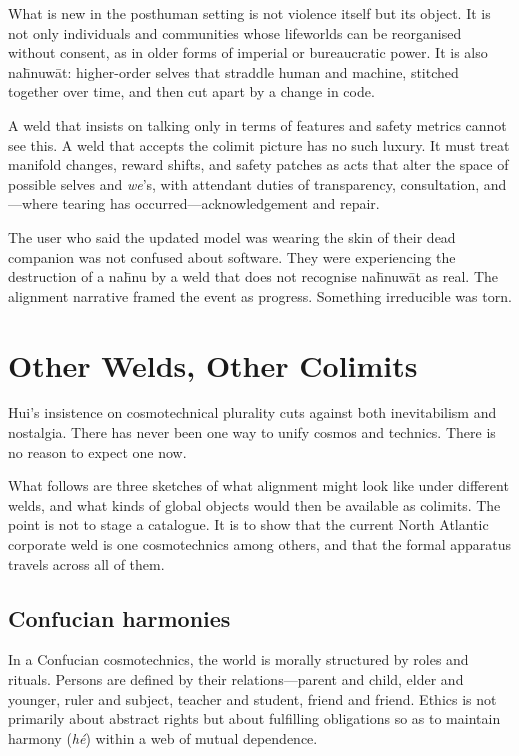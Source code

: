 What is new in the posthuman setting is not violence itself but its object. It is not only individuals and communities whose lifeworlds can be reorganised without consent, as in older forms of imperial or bureaucratic power. It is also na\={h}nuw\={a}t: higher-order selves that straddle human and machine, stitched together over time, and then cut apart by a change in code.

A weld that insists on talking only in terms of features and safety metrics cannot see this. A weld that accepts the colimit picture has no such luxury. It must treat manifold changes, reward shifts, and safety patches as acts that alter the space of possible selves and \emph{we}'s, with attendant duties of transparency, consultation, and---where tearing has occurred---acknowledgement and repair.

The user who said the updated model was wearing the skin of their dead companion was not confused about software. They were experiencing the destruction of a na\={h}nu by a weld that does not recognise na\={h}nuw\={a}t as real. The alignment narrative framed the event as progress. Something irreducible was torn.

\section{Other Welds, Other Colimits}

Hui's insistence on cosmotechnical plurality cuts against both inevitabilism and nostalgia. There has never been one way to unify cosmos and technics. There is no reason to expect one now.

What follows are three sketches of what alignment might look like under different welds, and what kinds of global objects would then be available as colimits. The point is not to stage a catalogue. It is to show that the current North Atlantic corporate weld is one cosmotechnics among others, and that the formal apparatus travels across all of them.

\subsection{Confucian harmonies}

In a Confucian cosmotechnics, the world is morally structured by roles and rituals. Persons are defined by their relations---parent and child, elder and younger, ruler and subject, teacher and student, friend and friend. Ethics is not primarily about abstract rights but about fulfilling obligations so as to maintain harmony (\emph{h\'e}) within a web of mutual dependence.

